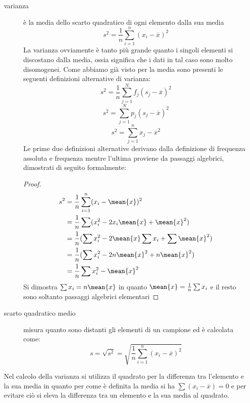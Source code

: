 \documentclass[a4paper,12pt, oneside]{book}
\begin{document}
\begin{description}
        \item [varianza] è la media dello scarto quadratico di ogni elemento dalla sua media 
                \[ s^2 = \frac{1}{n} \sum _{i = 1} ^ n (x_i - \overline{x})^2 \]
                La varianza ovviamente è tanto più grande quanto i singoli elementi si discostano dalla media, 
                ossia significa che i dati in tal caso sono molto disomogenei.
                Come abbiamo già visto per la media sono presenti le seguenti definizioni alternative di varianza:
                \[ s^2 = \frac{1}{n} \sum _{j = 1} ^ N f_j (s_j - \overline{x}) ^ 2 \]
                \[ s^2 = \sum _{j = 1} ^ N p_j (s_j - \overline{x}) ^ 2 \]
                \[ s^2 = \sum _{j = 1} ^ n x_j - \overline{x} ^ 2 \]
                Le prime due definizioni alternative derivano dalla definizione di frequenza assoluta e frequenza 
                mentre l'ultima proviene da passaggi algebrici, dimostrati di seguito formalmente:
                \begin{proof}
                        \[ \begin{split}
                            s^2 & = \frac{1}{n} \sum _{i = 1} ^ n (x_i - \mean{x}) ^ 2 \\
                                & = \frac{1}{n} \sum (x_i ^ 2 - 2x_i\mean{x} + \mean{x} ^ 2) \\
                                & = \frac{1}{n} (\sum x_i^2 - 2\mean{x} \sum x_i + \sum \mean{x} ^ 2) \\
                                & = \frac{1}{n} (\sum x_i^2 - 2n\mean{x}^2 + n\mean{x}^2) \\
                                & = \frac{1}{n} \sum x_i^2 - \mean{x} ^ 2 \\
                            \end{split} \]
                Si dimostra $\sum x_i = n \mean{x}$ in quanto $\mean{x} = \frac{1}{n} \sum x_i$ e il resto 
                sono soltanto passaggi algebrici elementari
                \end{proof}

    \item [scarto quadratico medio] misura quanto sono distanti gli elementi di un campione ed è calcolata come:
            \[ s = \sqrt{s^2} = \sqrt{\frac{1}{n} \sum _{i = 1} ^ n (x_i - \overline{x}) ^ 2} \]
\end{description}
Nel calcolo della varianza si utilizza il quadrato per la differenza tra l'elemento e la sua media in quanto 
per come è definita la media si ha $\sum (x_i - \overline{x}) = 0$ e per evitare ciò si eleva la differenza 
tra un elemento e la sua media al quadrato.
\end{document}
